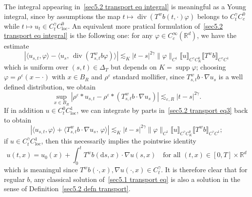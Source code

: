 \documentclass[10pt]{article}
\newcommand{\mathd}{\mathrm{d}}
\newcommand{\tmop}[1]{\ensuremath{\operatorname{#1}}}
\begin{document}
\begin{remark}
  \label{sec5.2 remark defn transport}The integral appearing in~{\eqref{sec5.2
  transport eq integral}} is meaningful as a Young integral, since by
  assumptions the map $t \mapsto \tmop{div} (T^w b (t, \cdot) \varphi)$
  belongs to $C^{\gamma}_t C^0_c$ while $t \mapsto u_t \in C^{\gamma}_t
  C^0_{\tmop{loc}}$. An equivalent more pratical formulation of~{\eqref{sec5.2
  transport eq integral}} is the following one: for any $\varphi \in
  C^{\infty}_c (\mathbb{R}^d)$, we have the estimate
  \begin{equation}
    \left| \langle u_{s, t}, \varphi \rangle - \langle u_s, \, \tmop{div}
    (T^w_{s, t} b \varphi) \rangle \right| \lesssim_K | t - s |^{2 \gamma} \|
    \varphi \|_{C^1}  \llbracket u \rrbracket_{C^{\gamma} C^0_K}  \llbracket
    T^w b \rrbracket_{C^{\gamma} C^1} \label{sec5.2 transport eq3}
  \end{equation}
  which is uniform over $(s, t) \in \Delta_T$ but depends on $K = \tmop{supp}
  \varphi$; choosing $\varphi = \rho^{\varepsilon} (x - \cdot)$ with $x \in
  B_R$ and $\rho^{\varepsilon}$ standard mollifier, since $T^w_{s, t} b \cdot
  \nabla u_s$ is a well defined distribution, we obtain
  \begin{equation}
    \sup_{x \in B_R} | \rho^{\varepsilon} \ast u_{s, t} - \rho^{\varepsilon}
    \ast (T^w_{s, t} b \cdot \nabla u_s) | \lesssim_{\varepsilon, R} | t - s
    |^{2 \gamma} . \label{sec5.2 transport eq5}
  \end{equation}
  If in addition $u \in C^0_t C^1_{\tmop{loc}}$, we can integrate by parts
  in~{\eqref{sec5.2 transport eq3}} back to obtain
  \[ \left| \langle u_{s, t}, \varphi \rangle + \langle T^w_{s, t} b \cdot
     \nabla u_s, \, \varphi \rangle \right| \lesssim_K | t - s |^{2 \gamma} \|
     \varphi \|_{C^1}  \llbracket u \rrbracket_{C^{\gamma} C^0_K}  \llbracket
     T^w b \rrbracket_{C^{\gamma} C^1} ; \]
  if $u \in C^{\gamma}_t C^1_{\tmop{loc}}$, then this necessarily implies the
  pointwise identity
  \begin{equation}
    u (t, x) = u_0 (x) + \int_0^t T^w b (\mathd s, x) \cdot \nabla u (s, x)
    \quad \text{for all } (t, x) \in [0, T] \times \mathbb{R}^d \label{sec5.2
    transport eq4}
  \end{equation}
  which is meaningul since $T^w b (\cdot, x), \nabla u (\cdot, x) \in
  C^{\gamma}_t$. It is therefore clear that for regular $b$, any classical
  solution of~{\eqref{sec5.1 transport eq}} is also a solution in the sense of
  Definition~\ref{sec5.2 defn transport}.
\end{remark}
\end{document}
